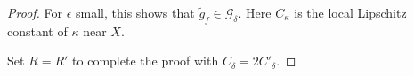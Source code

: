 \documentclass[11pt,letterpaper]{amsart}
\newtheorem{lemma}[theorem]{Lemma}
\numberwithin{equation}{section}
\begin{document}
\begin{itemize}
\begin{proof}
 
For $\epsilon$ small, this shows that $\tilde g_f \in \mathcal G_{\delta}$. Here $C_{\kappa}$ is the local Lipschitz constant of $\kappa$ near $X$.

Set $R = R'$ to complete the proof with $C_{\delta} = 2C'_{\delta}$. 


    
\end{proof}


\ 












    
    









\end{itemize}
\end{document}
